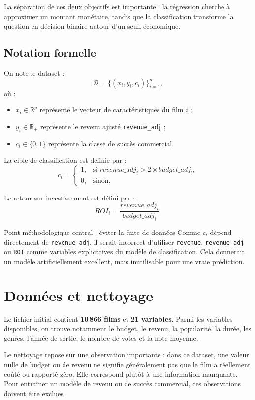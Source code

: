 \documentclass[11pt,a4paper]{article}
\begin{document}
La séparation de ces deux objectifs est importante : la régression cherche à approximer un montant monétaire, tandis que la classification transforme la question en décision binaire autour d'un seuil économique.

\subsection{Notation formelle}

On note le dataset :
\[
\mathcal{D} = \{(x_i, y_i, c_i)\}_{i=1}^{n},
\]
où :
\begin{itemize}
    \item $x_i \in \mathbb{R}^p$ représente le vecteur de caractéristiques du film $i$ ;
    \item $y_i \in \mathbb{R}_+$ représente le revenu ajusté \texttt{revenue\_adj} ;
    \item $c_i \in \{0,1\}$ représente la classe de succès commercial.
\end{itemize}

La cible de classification est définie par :
\[
c_i =
\begin{cases}
1, & \text{si } revenue\_adj_i > 2 \times budget\_adj_i,\\
0, & \text{sinon.}
\end{cases}
\]

Le retour sur investissement est défini par :
\[
ROI_i = \frac{revenue\_adj_i}{budget\_adj_i}.
\]

\begin{warningbox}{Point méthodologique central : éviter la fuite de données}
Comme $c_i$ dépend directement de \texttt{revenue\_adj}, il serait incorrect d'utiliser \texttt{revenue}, \texttt{revenue\_adj} ou \texttt{ROI} comme variables explicatives du modèle de classification. Cela donnerait un modèle artificiellement excellent, mais inutilisable pour une vraie prédiction.
\end{warningbox}

\section{Données et nettoyage}

Le fichier initial contient \textbf{10\,866 films} et \textbf{21 variables}. Parmi les variables disponibles, on trouve notamment le budget, le revenu, la popularité, la durée, les genres, l'année de sortie, le nombre de votes et la note moyenne.

Le nettoyage repose sur une observation importante : dans ce dataset, une valeur nulle de budget ou de revenu ne signifie généralement pas que le film a réellement coûté ou rapporté zéro. Elle correspond plutôt à une information manquante. Pour entraîner un modèle de revenu ou de succès commercial, ces observations doivent être exclues.
\end{document}
